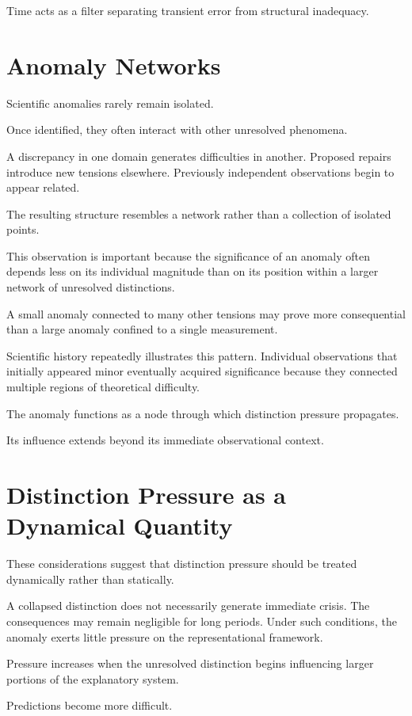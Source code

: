 \documentclass[11pt,oneside,openany]{book}
\begin{document}
Time acts as a filter separating transient error from structural inadequacy.

\section{Anomaly Networks}

Scientific anomalies rarely remain isolated.

Once identified, they often interact with other unresolved phenomena.

A discrepancy in one domain generates difficulties in another. Proposed repairs introduce new tensions elsewhere. Previously independent observations begin to appear related.

The resulting structure resembles a network rather than a collection of isolated points.

This observation is important because the significance of an anomaly often depends less on its individual magnitude than on its position within a larger network of unresolved distinctions.

A small anomaly connected to many other tensions may prove more consequential than a large anomaly confined to a single measurement.

Scientific history repeatedly illustrates this pattern. Individual observations that initially appeared minor eventually acquired significance because they connected multiple regions of theoretical difficulty.

The anomaly functions as a node through which distinction pressure propagates.

Its influence extends beyond its immediate observational context.

\section{Distinction Pressure as a Dynamical Quantity}

These considerations suggest that distinction pressure should be treated dynamically rather than statically.

A collapsed distinction does not necessarily generate immediate crisis. The consequences may remain negligible for long periods. Under such conditions, the anomaly exerts little pressure on the representational framework.

Pressure increases when the unresolved distinction begins influencing larger portions of the explanatory system.

Predictions become more difficult.
\end{document}

